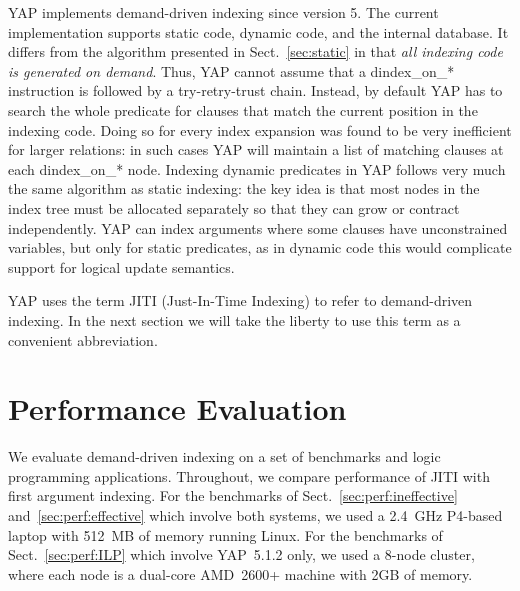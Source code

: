 \documentclass{llncs}
\newcommand{\instr}[1]{\textsf{#1}}
\newcommand{\TryRetryTrust}{\mbox{\instr{try-retry-trust}}\xspace}
\newcommand{\jitiSTAR}{\mbox{\instr{dindex\_on\_*}}\xspace}
\newcommand{\JITI}{demand-driven indexing\xspace}
\begin{document}
YAP implements \JITI since version 5. The current implementation
supports static code, dynamic code, and the internal database. It
differs from the algorithm presented in Sect.~\ref{sec:static} in that
\emph{all indexing code is generated on demand}. Thus, YAP cannot
assume that a \jitiSTAR instruction is followed by a \TryRetryTrust
chain. Instead, by default YAP has to search the whole predicate for
clauses that match the current position in the indexing code. Doing so
for every index expansion was found to be very inefficient for larger
relations: in such cases YAP will maintain a list of matching clauses
at each \jitiSTAR node. Indexing dynamic predicates in YAP follows
very much the same algorithm as static indexing: the key idea is that
most nodes in the index tree must be allocated separately so that they
can grow or contract independently. YAP can index arguments where some
clauses have unconstrained variables, but only for static predicates,
as in dynamic code this would complicate support for logical update
semantics.

YAP uses the term JITI (Just-In-Time Indexing) to refer to \JITI. In
the next section we will take the liberty to use this term as a
convenient abbreviation.


\section{Performance Evaluation} \label{sec:perf}
We evaluate \JITI on a set of benchmarks and logic programming applications.
Throughout, we compare performance of JITI with first argument
indexing. For the benchmarks of Sect.~\ref{sec:perf:ineffective}
and~\ref{sec:perf:effective} which involve both systems, we used a
2.4~GHz P4-based laptop with 512~MB of memory running Linux.
For the benchmarks of Sect.~\ref{sec:perf:ILP} which involve
YAP~5.1.2 only, we used a 8-node cluster, where each node is a
dual-core AMD~2600+ machine with 2GB of memory.
\end{document}
